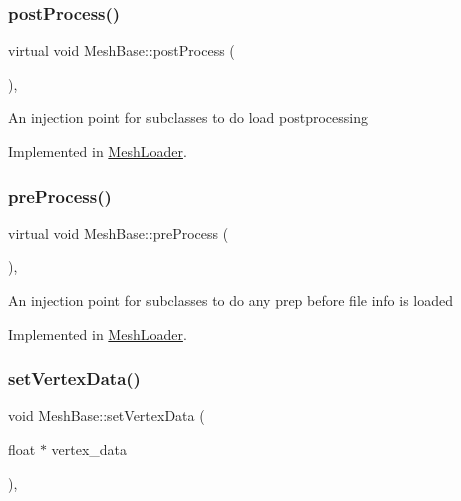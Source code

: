 \subsubsection{\texorpdfstring{post\+Process()}{postProcess()}}
{\footnotesize\ttfamily virtual void Mesh\+Base\+::post\+Process (\begin{DoxyParamCaption}{ }\end{DoxyParamCaption})\hspace{0.3cm}{\ttfamily [protected]}, {}}

An injection point for subclasses to do load postprocessing 

Implemented in \hyperlink{class_mesh_loader_a83a3c78a6c2df1087c9f9e28c63e6d51}{Mesh\+Loader}.

\mbox{\label{class_mesh_base_a25e192211e37cb69f9b5ce9aea25989a}} 
\subsubsection{\texorpdfstring{pre\+Process()}{preProcess()}}
{\footnotesize\ttfamily virtual void Mesh\+Base\+::pre\+Process (\begin{DoxyParamCaption}{ }\end{DoxyParamCaption})\hspace{0.3cm}{\ttfamily [protected]}, {}}

An injection point for subclasses to do any prep before file info is loaded 

Implemented in \hyperlink{class_mesh_loader_ad9c636920b31629f1c271b20a5fdc29b}{Mesh\+Loader}.

\mbox{\label{class_mesh_base_aa982e061ba3880ebdec15cff5310123b}} 
\subsubsection{\texorpdfstring{set\+Vertex\+Data()}{setVertexData()}}
{\footnotesize\ttfamily void Mesh\+Base\+::set\+Vertex\+Data (\begin{DoxyParamCaption}\item[{float $\ast$}]{vertex\+\_\+data }\end{DoxyParamCaption})\hspace{0.3cm}{\ttfamily [inline]}, {\ttfamily [protected]}}


